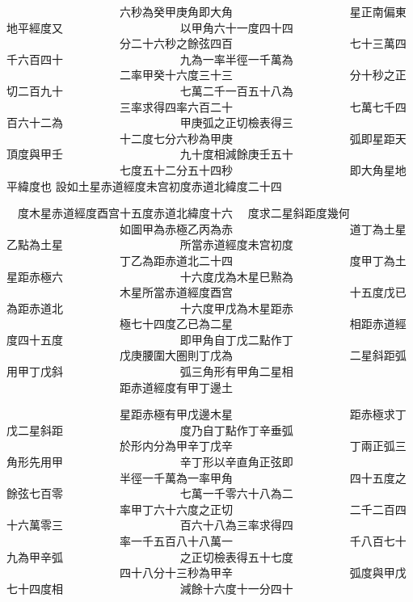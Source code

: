 \begin{正文}
　　　　　　　　　　六秒為癸甲庚角即大角
　　　　　　　　　　星正南偏東地平經度又
　　　　　　　　　　以甲角六十一度四十四
　　　　　　　　　　分二十六秒之餘弦四百
　　　　　　　　　　七十三萬四千六百四十
　　　　　　　　　　九為一率半徑一千萬為
　　　　　　　　　　二率甲癸十六度三十三
　　　　　　　　　　分十秒之正切二百九十
　　　　　　　　　　七萬二千一百五十八為
　　　　　　　　　　三率求得四率六百二十
　　　　　　　　　　七萬七千四百六十二為
　　　　　　　　　　甲庚弧之正切檢表得三
　　　　　　　　　　十二度七分六秒為甲庚
　　　　　　　　　　弧即星距天頂度與甲壬
　　　　　　　　　　九十度相減餘庚壬五十
　　　　　　　　　　七度五十二分五十四秒
　　　　　　　　　　即大角星地平緯度也
設如土星赤道經度未宫初度赤道北緯度二十四
\par
\end{正文}\clearpage
{}
\begin{正文}
　度木星赤道經度酉宫十五度赤道北緯度十六
　度求二星斜距度幾何
　　　　　　　　　　如圖甲為赤極乙丙為赤
　　　　　　　　　　道丁為土星乙點為土星
　　　　　　　　　　所當赤道經度未宫初度
　　　　　　　　　　丁乙為距赤道北二十四
　　　　　　　　　　度甲丁為土星距赤極六
　　　　　　　　　　十六度戊為木星巳㸃為
　　　　　　　　　　木星所當赤道經度酉宫
　　　　　　　　　　十五度戊已為距赤道北
　　　　　　　　　　十六度甲戊為木星距赤
　　　　　　　　　　極七十四度乙已為二星
　　　　　　　　　　相距赤道經度四十五度
　　　　　　　　　　即甲角自丁戊二點作丁
　　　　　　　　　　戊庚腰圍大圏則丁戊為
　　　　　　　　　　二星斜距弧用甲丁戊斜
　　　　　　　　　　弧三角形有甲角二星相
　　　　　　　　　　距赤道經度有甲丁邊土
\par
\end{正文}\clearpage
{}
\begin{正文}
　　　　　　　　　　星距赤極有甲戊邊木星
　　　　　　　　　　距赤極求丁戊二星斜距
　　　　　　　　　　度乃自丁點作丁辛垂弧
　　　　　　　　　　於形内分為甲辛丁戊辛
　　　　　　　　　　丁兩正弧三角形先用甲
　　　　　　　　　　辛丁形以辛直角正弦即
　　　　　　　　　　半徑一千萬為一率甲角
　　　　　　　　　　四十五度之餘弦七百零
　　　　　　　　　　七萬一千零六十八為二
　　　　　　　　　　率甲丁六十六度之正切
　　　　　　　　　　二千二百四十六萬零三
　　　　　　　　　　百六十八為三率求得四
　　　　　　　　　　率一千五百八十八萬一
　　　　　　　　　　千八百七十九為甲辛弧
　　　　　　　　　　之正切檢表得五十七度
　　　　　　　　　　四十八分十三秒為甲辛
　　　　　　　　　　弧度與甲戊七十四度相
　　　　　　　　　　減餘十六度十一分四十
\par
\end{正文}\clearpage
